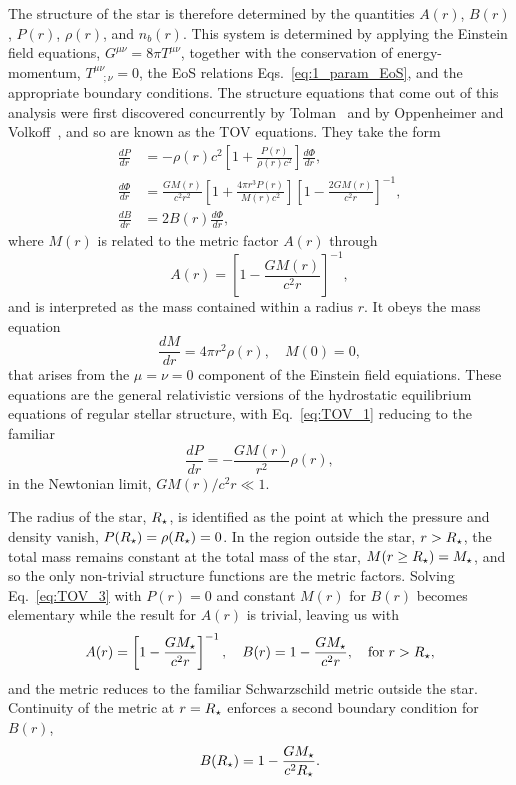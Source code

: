 The structure of the star is therefore determined by the quantities $A(r)$, $B(r)$, $P(r)$, $\rho(r)$, and $n_b(r)$. This system is determined by applying the Einstein field equations, $G^{\mu\nu} = 8\pi T^{\mu\nu}$, together with the conservation of energy-momentum, $T^{\mu\nu}_{\quad;\nu}=0$, the EoS relations Eqs.~\ref{eq:1_param_EoS}, and the appropriate boundary conditions. The structure equations that come out of this analysis were first discovered concurrently by Tolman~\cite{Tolman:1939jz_StaticSolutionsEinstein} and by Oppenheimer and Volkoff~\cite{Oppenheimer:1939ne_MassiveNeutronCores}, and so are known as the TOV equations. They take the form
\begin{align}
    \frac{dP}{dr} &= -\rho(r) c^2  \left[ 1 + \frac{P(r)}{\rho(r) c^2} \right]\frac{d\Phi}{dr},\label{eq:TOV_1}\\
    \frac{d\Phi}{dr} & = \frac{G M(r)}{c^2 r^2} \left[ 1 + \frac{4\pi r^3 P(r)}{M(r)c^2} \right] \left[ 1 - \frac{2 G M(r)}{c^2 r}\right]^{-1}\label{eq:TOV_2},\\
    \frac{dB}{dr} & = 2B(r) \frac{d\Phi}{dr},\label{eq:TOV_3}
\end{align}
where $M(r)$ is related to the metric factor $A(r)$ through
\begin{equation}
    A(r) = \left[ 1 - \frac{G M(r)}{c^2 r} \right]^{-1},
\end{equation}
and is interpreted as the mass contained within a radius $r$. It obeys the mass equation 
\begin{equation}
    \frac{dM}{dr} = 4\pi r^2 \rho(r),\quad M(0) = 0,
    \label{eq:mass_equation_TOV}
\end{equation}
that arises from the $\mu = \nu = 0$ component of the Einstein field equiations. 
These equations are the general relativistic versions of the hydrostatic equilibrium equations of regular stellar structure, with Eq.~\ref{eq:TOV_1} reducing to the familiar 
\begin{equation}
    \frac{dP}{dr} = -\frac{GM(r)}{r^2}\rho(r),
\end{equation}
in the Newtonian limit, $GM(r)/c^2 r \ll 1$.

The radius of the star, $R_\star$, is identified as the point at which the pressure and density vanish, $P(R_\star) = \rho(R_\star) = 0$. In the region outside the star, $r>R_\star$, the total mass remains constant at the total mass of the star, $M(r \geq  R_\star) = M_\star$, and so the only non-trivial structure functions are the metric factors. Solving Eq.~\ref{eq:TOV_3} with $P(r)=0$ and constant $M(r)$ for $B(r)$ becomes elementary while the result for $A(r)$ is trivial, leaving us with
\begin{equation}
    A(r) = \left[ 1 - \frac{G M_\star}{c^2 r} \right]^{-1}, \quad B(r) = 1 - \frac{G M_\star}{c^2 r} ,\quad\mathrm{for}\;r > R_\star,
\end{equation}
and the metric reduces to the familiar Schwarzschild metric outside the star. 
Continuity of the metric at $r= R_\star$ enforces a second boundary condition for $B(r)$,
\begin{equation}
    B(R_\star) = 1 - \frac{G M_\star}{c^2 R_\star}.
    \label{eq:B_boundary_condition}
\end{equation}

